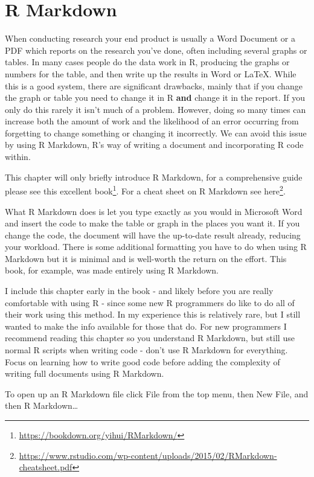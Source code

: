 \documentclass[
]{krantz}
\renewcommand{\href}[2]{#2\footnote{\url{#1}}}
\begin{document}
\hypertarget{r-markdown}{%
\chapter{R Markdown}\label{r-markdown}}

When conducting research your end product is usually a Word
Document or a PDF which reports on the research you've done,
often including several graphs or tables. In many cases
people do the data work in R, producing the graphs or
numbers for the table, and then write up the results in Word
or LaTeX. While this is a good system, there are significant
drawbacks, mainly that if you change the graph or table you
need to change it in R \textbf{and} change it in the report.
If you only do this rarely it isn't much of a problem.
However, doing so many times can increase both the amount of
work and the likelihood of an error occurring from
forgetting to change something or changing it incorrectly.
We can avoid this issue by using R Markdown, R's way of
writing a document and incorporating R code within.

This chapter will only briefly introduce R Markdown, for a
comprehensive guide please see
\href{https://bookdown.org/yihui/RMarkdown/}{this excellent
book}. For a cheat sheet on R Markdown see
\href{https://www.rstudio.com/wp-content/uploads/2015/02/RMarkdown-cheatsheet.pdf}{here}.

What R Markdown does is let you type exactly as you would in
Microsoft Word and insert the code to make the table or
graph in the places you want it. If you change the code, the
document will have the up-to-date result already, reducing
your workload. There is some additional formatting you have
to do when using R Markdown but it is minimal and is
well-worth the return on the effort. This book, for example,
was made entirely using R Markdown.

I include this chapter early in the book - and likely before
you are really comfortable with using R - since some new R
programmers do like to do all of their work using this
method. In my experience this is relatively rare, but I
still wanted to make the info available for those that do.
For new programmers I recommend reading this chapter so you
understand R Markdown, but still use normal R scripts when
writing code - don't use R Markdown for everything. Focus on
learning how to write good code before adding the complexity
of writing full documents using R Markdown.

To open up an R Markdown file click File from the top menu,
then New File, and then R Markdown\ldots{}
\end{document}
